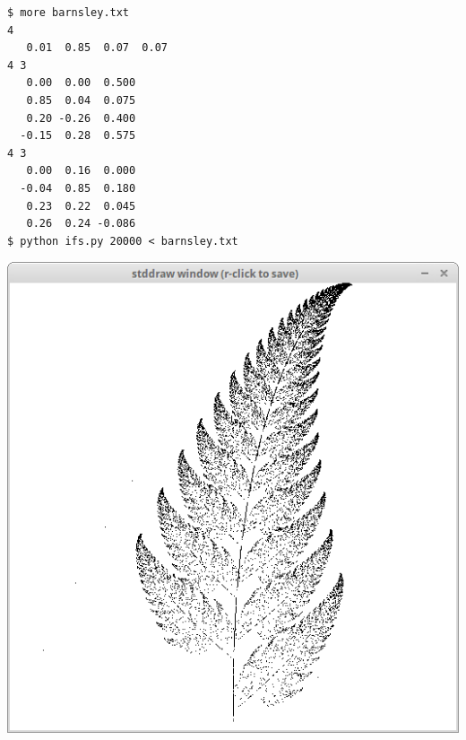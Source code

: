 \documentclass[8pt,a4paper,compress,handout]{beamer}
\begin{document}
\begin{frame}[fragile]
\begin{minipage}{160pt}
\begin{lstlisting}[language={}]
$ more barnsley.txt
4
   0.01  0.85  0.07  0.07
4 3
   0.00  0.00  0.500
   0.85  0.04  0.075
   0.20 -0.26  0.400
  -0.15  0.28  0.575
4 3
   0.00  0.16  0.000
  -0.04  0.85  0.180
   0.23  0.22  0.045
   0.26  0.24 -0.086
$ python ifs.py 20000 < barnsley.txt
\end{lstlisting}
\end{minipage}%
\begin{minipage}{140pt}
\begin{center}
\hfill \includegraphics[scale=0.17]{figures/barnsley.png}
\end{center}
\end{minipage}
\end{frame}
\end{document}
